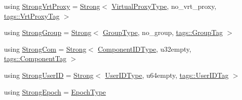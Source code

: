 \begin{DoxyCompactItemize}
\item 
using \hyperlink{namespacevt_1_1collective_1_1reduce_1_1detail_a492943cffff6d1a92386468d46f589df}{Strong\+Vrt\+Proxy} = \hyperlink{namespacevt_adbd3338278905742eb2de6db590fd2f1}{Strong}$<$ \hyperlink{namespacevt_a1b417dd5d684f045bb58a0ede70045ac}{Virtual\+Proxy\+Type}, no\+\_\+vrt\+\_\+proxy, \hyperlink{structvt_1_1collective_1_1reduce_1_1detail_1_1tags_1_1_vrt_proxy_tag}{tags\+::\+Vrt\+Proxy\+Tag} $>$
\item 
using \hyperlink{namespacevt_1_1collective_1_1reduce_1_1detail_adcad97800459415ff6ea4b5feb90e0f2}{Strong\+Group} = \hyperlink{namespacevt_adbd3338278905742eb2de6db590fd2f1}{Strong}$<$ \hyperlink{namespacevt_a27b5e4411c9b6140c49100e050e2f743}{Group\+Type}, no\+\_\+group, \hyperlink{structvt_1_1collective_1_1reduce_1_1detail_1_1tags_1_1_group_tag}{tags\+::\+Group\+Tag} $>$
\item 
using \hyperlink{namespacevt_1_1collective_1_1reduce_1_1detail_a6ea2d8e8f8ba226a6e704a9041aebaec}{Strong\+Com} = \hyperlink{namespacevt_adbd3338278905742eb2de6db590fd2f1}{Strong}$<$ \hyperlink{namespacevt_ab6ac935c168b809c422d5121da4f2700}{Component\+I\+D\+Type}, u32empty, \hyperlink{structvt_1_1collective_1_1reduce_1_1detail_1_1tags_1_1_component_tag}{tags\+::\+Component\+Tag} $>$
\item 
using \hyperlink{namespacevt_1_1collective_1_1reduce_1_1detail_af9e42b20d1be7dccc1b5e587f0387e02}{Strong\+User\+ID} = \hyperlink{namespacevt_adbd3338278905742eb2de6db590fd2f1}{Strong}$<$ \hyperlink{namespacevt_1_1collective_1_1reduce_1_1detail_ae82d7b96b0885b9b7dfb0104398beead}{User\+I\+D\+Type}, u64empty, \hyperlink{structvt_1_1collective_1_1reduce_1_1detail_1_1tags_1_1_user_i_d_tag}{tags\+::\+User\+I\+D\+Tag} $>$
\item 
using \hyperlink{namespacevt_1_1collective_1_1reduce_1_1detail_ad6739d14b8ee41189f785355708748fc}{Strong\+Epoch} = \hyperlink{namespacevt_a81d11b28122d43bf9834577e4a06440f}{Epoch\+Type}
\end{DoxyCompactItemize}
